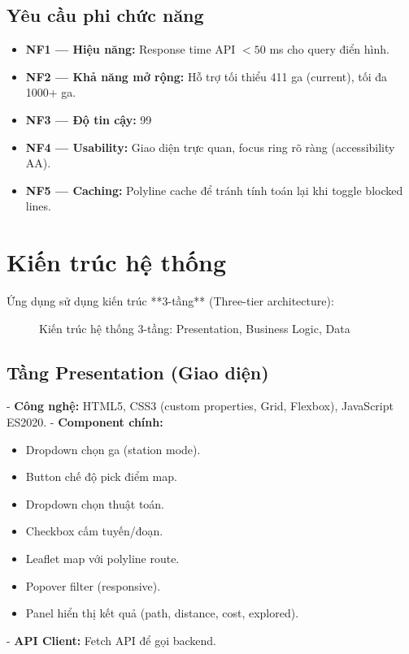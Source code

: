 \subsection{Yêu cầu phi chức năng}

\begin{itemize}
  \item \textbf{NF1 --- Hiệu năng:} Response time API $< 50$ ms cho query điển hình.
  \item \textbf{NF2 --- Khả năng mở rộng:} Hỗ trợ tối thiểu 411 ga (current), tối đa 1000+ ga.
  \item \textbf{NF3 --- Độ tin cậy:} 99%
  \item \textbf{NF4 --- Usability:} Giao diện trực quan, focus ring rõ ràng (accessibility AA).
  \item \textbf{NF5 --- Caching:} Polyline cache để tránh tính toán lại khi toggle blocked lines.
\end{itemize}

\section{Kiến trúc hệ thống}

Ứng dụng sử dụng kiến trúc **3-tầng** (Three-tier architecture):

\begin{figure}[H]
  \centering
  \caption{Kiến trúc hệ thống 3-tầng: Presentation, Business Logic, Data}
  \label{fig:architecture}
\end{figure}

\subsection{Tầng Presentation (Giao diện)}

- \textbf{Công nghệ:} HTML5, CSS3 (custom properties, Grid, Flexbox), JavaScript ES2020.
- \textbf{Component chính:}
  \begin{itemize}
    \item Dropdown chọn ga (station mode).
    \item Button chế độ pick điểm map.
    \item Dropdown chọn thuật toán.
    \item Checkbox cấm tuyến/đoạn.
    \item Leaflet map với polyline route.
    \item Popover filter (responsive).
    \item Panel hiển thị kết quả (path, distance, cost, explored).
  \end{itemize}
- \textbf{API Client:} Fetch API để gọi backend.

